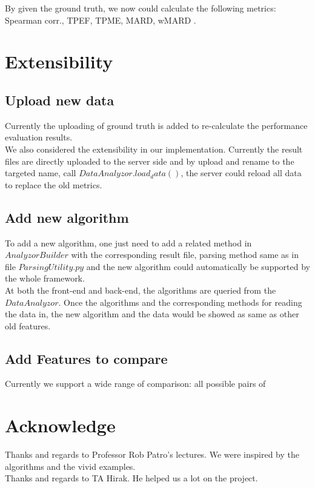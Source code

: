 \documentclass[11pt,letter]{article}
\begin{document}
By given the ground truth, we now could calculate the following metrics: Spearman corr., TPEF, TPME, MARD, wMARD \cite{rapmap}.


\section {Extensibility}
\subsection {Upload new data}
Currently the uploading of ground truth is added to re-calculate the performance evaluation results. \\
We also considered the extensibility in our implementation. Currently the result files are directly uploaded to the server side and by upload and rename to the targeted name, call $DataAnalyzor.load_data()$, the server could reload all data to replace the old metrics.
\subsection {Add new algorithm}
To add a new algorithm, one just need to add a related method in $AnalyzorBuilder$  with the corresponding result file, parsing method same as in file $ParsingUtility.py$ and the new algorithm could automatically be supported by the whole framework. \\
At both the front-end and back-end, the algorithms are queried from the $DataAnalyzor$. Once the algorithms and the corresponding methods for reading the data in, the new algorithm and the data would be showed as same as other old features.
\subsection {Add Features to compare}
Currently we support a wide range of comparison: all possible pairs of \\


\section{Acknowledge}
Thanks and regards to Professor Rob Patro's lectures. We were inspired by the algorithms and the vivid examples. \\
Thanks and regards to TA Hirak. He helped us a lot on the project.

% 
\end{document}
